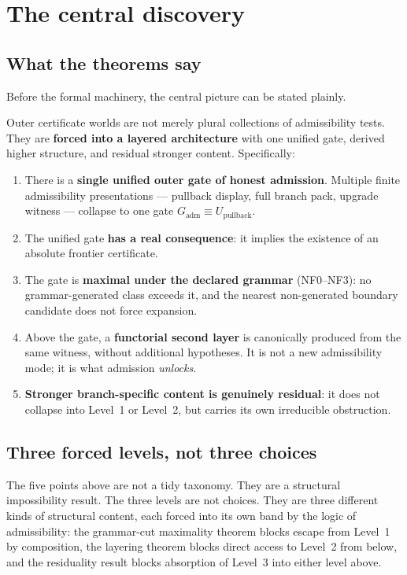 \documentclass[11pt]{article}
\theoremstyle{plain}
\theoremstyle{definition}
\theoremstyle{remark}
\newcommand{\Gadm}{G_{\mathrm{adm}}}
\newcommand{\Upb}{U_{\mathrm{pullback}}}
\begin{document}
\section{The central discovery}
\label{sec:thesis}

\subsection{What the theorems say}

Before the formal machinery, the central picture can be stated plainly.

\begin{keybox}[title=Central discovery]
Outer certificate worlds are not merely plural collections of admissibility
tests.  They are \textbf{forced into a layered architecture} with one
unified gate, derived higher structure, and residual stronger content.
Specifically:
\begin{enumerate}[label=(\arabic*)]
  \item There is a \textbf{single unified outer gate of honest admission}.
    Multiple finite admissibility presentations --- pullback display, full
    branch pack, upgrade witness --- collapse to one gate $\Gadm \equiv \Upb$.
  \item The unified gate \textbf{has a real consequence}: it implies the
    existence of an absolute frontier certificate.
  \item The gate is \textbf{maximal under the declared grammar}
    (NF0--NF3): no grammar-generated class exceeds it, and the nearest
    non-generated boundary candidate does not force expansion.
  \item Above the gate, a \textbf{functorial second layer} is canonically
    produced from the same witness, without additional hypotheses.  It is
    not a new admissibility mode; it is what admission \emph{unlocks}.
  \item \textbf{Stronger branch-specific content is genuinely residual}:
    it does not collapse into Level~1 or Level~2, but carries its own
    irreducible obstruction.
\end{enumerate}
\end{keybox}

\subsection{Three forced levels, not three choices}

The five points above are not a tidy taxonomy.  They are a structural
impossibility result.  The three levels are not choices.  They are three
different kinds of structural content, each forced into its own band by
the logic of admissibility: the grammar-cut maximality theorem blocks
escape from Level~1 by composition, the layering theorem blocks direct
access to Level~2 from below, and the residuality result blocks absorption
of Level~3 into either level above.
\end{document}
